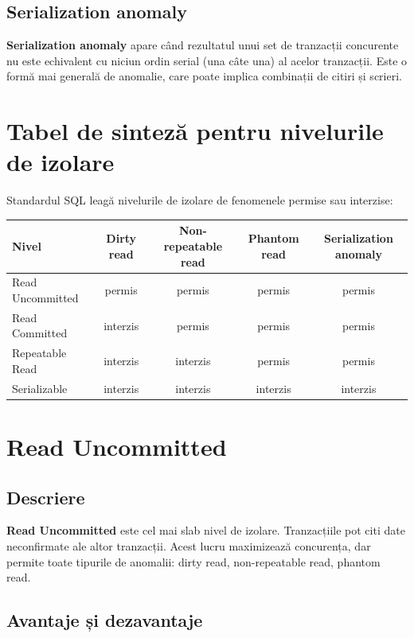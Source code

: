 \documentclass[11pt,a4paper]{article}
\begin{document}
\subsection{Serialization anomaly}

\textbf{Serialization anomaly} apare când rezultatul unui set de tranzacții concurente nu este echivalent cu niciun ordin serial (una câte una) al acelor tranzacții. Este o formă mai generală de anomalie, care poate implica combinații de citiri și scrieri.

\section{Tabel de sinteză pentru nivelurile de izolare}

Standardul SQL leagă nivelurile de izolare de fenomenele permise sau interzise:

\begin{center}
\begin{tabular}{lcccc}
\toprule
\textbf{Nivel} & \textbf{Dirty read} & \textbf{Non-repeatable read} & \textbf{Phantom read} & \textbf{Serialization anomaly} \\
\midrule
Read Uncommitted & permis & permis & permis & permis \\
Read Committed   & interzis & permis & permis & permis \\
Repeatable Read  & interzis & interzis & permis & permis \\
Serializable     & interzis & interzis & interzis & interzis \\
\bottomrule
\end{tabular}
\end{center}

\section{Read Uncommitted}

\subsection{Descriere}

\textbf{Read Uncommitted} este cel mai slab nivel de izolare. Tranzacțiile pot citi date neconfirmate ale altor tranzacții. Acest lucru maximizează concurența, dar permite toate tipurile de anomalii: dirty read, non-repeatable read, phantom read.

\subsection{Avantaje și dezavantaje}
\end{document}

